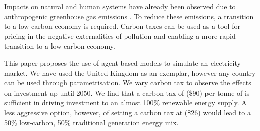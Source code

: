 Impacts on natural and human systems have already been observed due to anthropogenic greenhouse gas emissions \cite{Masson-Delmotte2018}. To reduce these emissions, a transition to a low-carbon economy is required. Carbon taxes can be used as a tool for pricing in the negative externalities of pollution and enabling a more rapid transition to a low-carbon economy.

This paper proposes the use of agent-based models to simulate an electricity market. We have used the United Kingdom as an exemplar, however any country can be used through parametrisation. We vary carbon tax to observe the effects on investment up until 2050. We find that a carbon tax of  (\$90) per tonne of  is sufficient in driving investment to an almost 100\% renewable energy supply. A less aggressive option, however, of setting a carbon tax at  (\$26) would lead to a 50\% low-carbon, 50\% traditional generation energy mix.

